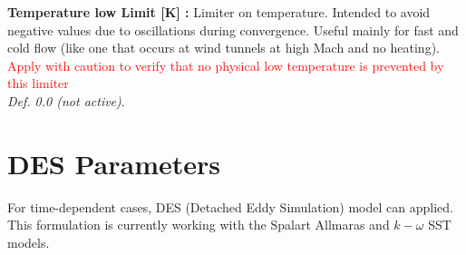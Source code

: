 \documentclass[12pt,epsf,colordvi]{article}
\begin{document}
\begin{description}
   \item{ \bf  Temperature low Limit [K] : } Limiter on temperature. Intended to avoid negative values due to oscillations during convergence. Useful mainly for fast and cold flow (like one that occurs at wind tunnels at high Mach and no heating).  \textcolor{red}{Apply with caution to verify that no physical low temperature is prevented by this limiter }  \\
	{\it Def.  0.0   (not active)}.  
%
\end{description}
%
\noindent
\section{ DES Parameters} \label{sec:des}
%
For time-dependent cases, DES (Detached Eddy Simulation) model can applied. This formulation is currently working with the Spalart Allmaras and \(k-\omega\) SST models.
%
\end{document}
